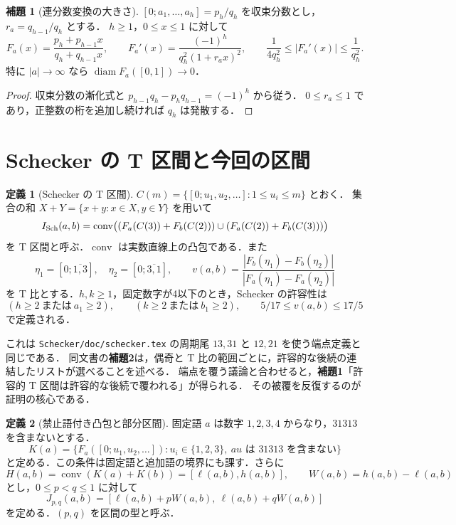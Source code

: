 \documentclass[10pt,a4paper]{article}
\theoremstyle{definition}
\newtheorem{definition}{定義}
\newtheorem{lemma}{補題}
\newcommand{\conv}{\operatorname{conv}}
\newcommand{\file}[1]{{\small\nolinkurl{#1}}}
\begin{document}
\begin{lemma}[連分数変換の大きさ]\label{lem:cf}
$[0;a_1,\ldots,a_h]=p_h/q_h$ を収束分数とし，$r_a=q_{h-1}/q_h$ とする．
$h\ge1$，$0\le x\le1$ に対して
\[
 F_a(x)=\frac{p_h+p_{h-1}x}{q_h+q_{h-1}x},\qquad
 F_a'(x)=\frac{(-1)^h}{q_h^2(1+r_ax)^2},\qquad
 \frac1{4q_h^2}\le|F_a'(x)|\le\frac1{q_h^2}.
\]
特に $|a|\to\infty$ なら $\operatorname{diam}F_a([0,1])\to0$．
\end{lemma}
\begin{proof}
収束分数の漸化式と $p_{h-1}q_h-p_hq_{h-1}=(-1)^h$ から従う．
$0\le r_a\le1$ であり，正整数の桁を追加し続ければ $q_h$ は発散する．
\end{proof}

\section{Schecker の T 区間と今回の区間}
\begin{definition}[Schecker の T 区間]\label{def:T}
$C(m)=\{[0;u_1,u_2,\ldots]:1\le u_i\le m\}$ とおく．
集合の和 $X+Y=\{x+y:x\in X,y\in Y\}$ を用いて
\[
 I_{\rm Sch}(a,b)=\conv\bigl((F_a(C(3))+F_b(C(2)))
                  \cup(F_a(C(2))+F_b(C(3)))\bigr)
\]
を T 区間と呼ぶ．$\conv$ は実数直線上の凸包である．また
\[
 \eta_1=[0;\overline{1,3}],\quad\eta_2=[0;\overline{3,1}],\qquad
 v(a,b)=\frac{|F_b(\eta_1)-F_b(\eta_2)|}{|F_a(\eta_1)-F_a(\eta_2)|}
\]
を T 比とする．$h,k\ge1$，固定数字が4以下のとき，Schecker の許容性は
\[
 (h\ge2\ \text{または}\ a_1\ge2),\qquad
 (k\ge2\ \text{または}\ b_1\ge2),\qquad 5/17\le v(a,b)\le17/5
\]
で定義される．
\end{definition}

これは \file{Schecker/doc/schecker.tex} の周期尾 $13,31$ と $12,21$ を使う端点定義と同じである．
同文書の\textbf{補題2}は，偶奇と T 比の範囲ごとに，許容的な後続の連結したリストが選べることを述べる．
端点を覆う議論と合わせると，\textbf{補題1}「許容的 T 区間は許容的な後続で覆われる」が得られる．
その被覆を反復するのが証明の核心である．

\begin{definition}[禁止語付き凸包と部分区間]\label{def:band}
固定語 $a$ は数字 $1,2,3,4$ からなり，$31313$ を含まないとする．
\[
 K(a)=\{F_a([0;u_1,u_2,\ldots]):u_i\in\{1,2,3\},\ au\text{ は }31313\text{ を含まない}\}
\]
と定める．この条件は固定語と追加語の境界にも課す．さらに
\[
 H(a,b)=\conv(K(a)+K(b))=[\ell(a,b),h(a,b)],\qquad W(a,b)=h(a,b)-\ell(a,b)
\]
とし，$0\le p<q\le1$ に対して
\[
 J_{p,q}(a,b)=[\ell(a,b)+pW(a,b),\ \ell(a,b)+qW(a,b)]
\]
を定める．$(p,q)$ を区間の型と呼ぶ．
\end{definition}
\end{document}
